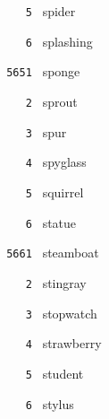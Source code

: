 \documentclass[11pt]{article}
\begin{document}
\begin{multicols}{6}
\noindent \texttt{ \ \ \ 5 } spider  \par
\noindent \texttt{ \ \ \ 6 } splashing  \par
\vspace{3mm}
\noindent \texttt{ 5651 } sponge  \par
\noindent \texttt{ \ \ \ 2 } sprout  \par
\noindent \texttt{ \ \ \ 3 } spur  \par
\noindent \texttt{ \ \ \ 4 } spyglass  \par
\noindent \texttt{ \ \ \ 5 } squirrel  \par
\noindent \texttt{ \ \ \ 6 } statue  \par
\vspace{3mm}
\noindent \texttt{ 5661 } steamboat  \par
\noindent \texttt{ \ \ \ 2 } stingray  \par
\noindent \texttt{ \ \ \ 3 } stopwatch  \par
\noindent \texttt{ \ \ \ 4 } strawberry  \par
\noindent \texttt{ \ \ \ 5 } student  \par
\noindent \texttt{ \ \ \ 6 } stylus  \par
\end{multicols}
\end{document}
